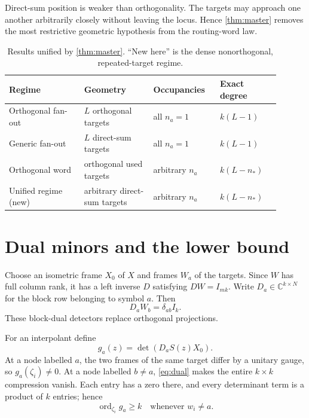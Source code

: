 \documentclass[11pt]{article}
\theoremstyle{definition}\newtheorem{definition}[theorem]{Definition}\newtheorem{example}[theorem]{Example}
\theoremstyle{remark}\newtheorem{remark}[theorem]{Remark}\newtheorem{limitation}[theorem]{Limitation}
\newcommand{\C}{\mathbb C}\newcommand{\D}{\mathbb D}\newcommand{\T}{\mathbb T}
\begin{document}
Direct-sum position is weaker than orthogonality.  The targets may approach
one another arbitrarily closely without leaving the locus.  Hence
\cref{thm:master} removes the most restrictive geometric hypothesis from
the routing-word law.

\begin{table}[t]
\centering\small
\caption{Results unified by \cref{thm:master}.  ``New here'' is the dense
nonorthogonal, repeated-target regime.}
\label{tab:regimes}
\begin{tabular}{@{}L{0.25\linewidth}L{0.23\linewidth}L{0.22\linewidth}L{0.20\linewidth}@{}}\toprule
Regime & Geometry & Occupancies & Exact degree\\\midrule
Orthogonal fan-out & $L$ orthogonal targets & all $n_a=1$ & $k(L-1)$\\
Generic fan-out & $L$ direct-sum targets & all $n_a=1$ & $k(L-1)$\\
Orthogonal word & orthogonal used targets & arbitrary $n_a$ & $k(L-n_*)$\\
Unified regime (new) & arbitrary direct-sum targets & arbitrary $n_a$ & $k(L-n_*)$\\
\bottomrule\end{tabular}
\end{table}

\section{Dual minors and the lower bound}

Choose an isometric frame $X_0$ of $X$ and frames $W_a$ of the targets.
Since $W$ has full column rank, it has a left inverse $D$ satisfying
$DW=I_{mk}$.  Write $D_a\in\C^{k\times N}$ for the block row belonging to
symbol $a$.  Then
\begin{equation}\label{eq:dual}
                         D_aW_b=\delta_{ab}I_k.
\end{equation}
These block-dual detectors replace orthogonal projections.

For an interpolant define
\begin{equation}\label{eq:minor}
                         g_a(z)=\det(D_aS(z)X_0).
\end{equation}
At a node labelled $a$, the two frames of the same target differ by a
unitary gauge, so $g_a(\zeta_i)\ne0$.  At a node labelled $b\ne a$,
\cref{eq:dual} makes the entire $k\times k$ compression vanish.  Each entry
has a zero there, and every determinant term is a product of $k$ entries;
hence
\begin{equation}\label{eq:forced-order}
                   \operatorname{ord}_{\zeta_i}g_a\ge k
                   \quad\text{whenever }w_i\ne a.
\end{equation}
\end{document}
